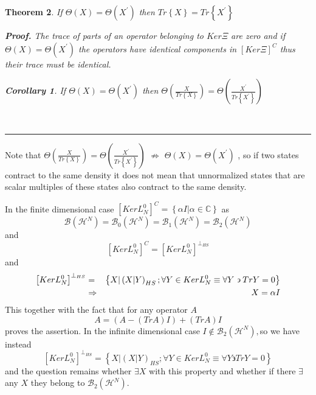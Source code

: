 \documentclass[aps,preprint]{revtex4}
\newtheorem{theorem}{Theorem}
\newtheorem{corollary}[theorem]{Corollary}
\newenvironment{proof}[1][Proof]{\noindent\textbf{#1.} }{\ \rule{0.5em}{0.5em}}
\begin{document}
\begin{theorem}
If $\Theta \left( X\right) =\Theta \left( X^{\prime }\right) $ then $%
Tr\left\{ X\right\} =Tr\left\{ X^{\prime }\right\} $

\begin{proof}
The trace of parts of an operator belonging to $Ker\Xi $ are zero and if $%
\Theta \left( X\right) =\Theta \left( X^{\prime }\right) $ the operators
have identical components in $\left[ Ker\Xi \right] ^{C}$ thus their trace
must be identical.

\begin{corollary}
If $\Theta \left( X\right) =\Theta \left( X^{\prime }\right) $ then $\Theta
\left( \frac{X}{Tr\left\{ X\right\} }\right) =\Theta \left( \frac{X^{\prime }%
}{Tr\left\{ X^{\prime }\right\} }\right) $
\end{corollary}
\end{proof}
\end{theorem}

Note that $\Theta \left( \frac{X}{Tr\left\{ X\right\} }\right) =\Theta
\left( \frac{X^{\prime }}{Tr\left\{ X^{\prime }\right\} }\right) $ $%
\not\Rightarrow $ $\Theta \left( X\right) =\Theta \left( X^{\prime }\right) $%
, so if two states contract to the same density it does not mean that
unnormalized states that are scalar multiples of these states also contract
to the same density.

In the finite dimensional case $\left[ KerL_{N}^{0}\right] ^{C}=\left\{
\alpha I|\alpha \in \mathbb{C}\right\} $ as%
\begin{equation}
\mathcal{B}\left( \mathcal{H}^{N}\right) =\mathcal{B}_{0}\left( \mathcal{H}%
^{N}\right) =\mathcal{B}_{1}\left( \mathcal{H}^{N}\right) =\mathcal{B}%
_{2}\left( \mathcal{H}^{N}\right)
\end{equation}%
and 
\begin{equation}
\left[ KerL_{N}^{0}\right] ^{C}=\left[ KerL_{N}^{0}\right] ^{\bot _{HS}}
\end{equation}%
and 
\begin{eqnarray}
\left[ KerL_{N}^{0}\right] ^{\bot _{HS}} &=&\left\{ X|\left( X|Y\right)
_{HS};\forall Y\in KerL_{N}^{0}\equiv \forall Y\backepsilon TrY=0\right\} 
\notag \\
&\Rightarrow &X=\alpha I
\end{eqnarray}%
This together with the fact that for any operator $A$ 
\begin{equation}
A=\left( A-\left( TrA\right) I\right) +\left( TrA\right) I
\end{equation}%
proves the assertion. In the infinite dimensional case $I\notin \mathcal{B}%
_{2}\left( \mathcal{H}^{N}\right) ,$so we have instead 
\begin{equation}
\left[ KerL_{N}^{0}\right] ^{\bot _{HS}}=\left\{ X|\left( X|Y\right)
_{HS};\forall Y\in KerL_{N}^{0}\equiv \forall Y\backepsilon TrY=0\right\}
\end{equation}%
and the question remains whether $\exists X$ with this property and whether
if there $\exists $ any $X$ they belong to $\mathcal{B}_{2}\left( \mathcal{H}%
^{N}\right) $.
\end{document}
